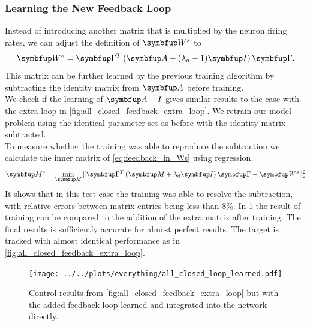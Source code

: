 \subsubsection{Learning the New Feedback Loop}
Instead of introducing another matrix that is multiplied by the neuron firing rates, we can adjust the definition of $\bmu{W}^s$ to
\begin{equation}\label{eq:feedback_in_Ws}
\bmu{W}^s = \bmu{\Gamma}^T\left(\bmu{A} + (\lambda_d-1)\bmu{I} \right)\bmu{\Gamma}.
\end{equation}
This matrix can be further learned by the previous training algorithm by subtracting the identity matrix from $\bmu{A}$ before training.\\
We check if the learning of $\bmu{A-I}$ gives similar results to the case with the extra loop in \cref{fig:all_closed_feedback_extra_loop}. We retrain our model problem using the identical parameter set as before with the identity matrix subtracted.\\
To measure whether the training was able to reproduce the subtraction we calculate the inner matrix of \cref{eq:feedback_in_Ws} using regression.
\begin{equation}
	\bmu{M^*} = \min_{\bmu{M}} \| \bmu{\Gamma}^T\left(\bmu{M}+\lambda_d\bmu{I}\right)\bmu{\Gamma} - \bmu{W}^s\|_2^2
\end{equation}
It shows that in this test case the training was able to resolve the subtraction, with relative errors between matrix entries being less than 8\%.
In \cref{fig:all_closed_loop_learned} the result of training can be compared to the addition of the extra matrix after training. The final results is sufficiently accurate for almost perfect results. The target is tracked with almost identical performance as in \cref{fig:all_closed_feedback_extra_loop}.
\begin{figure}
	\centering
	\texttt{[image: ../../plots/everything/all\_closed\_loop\_learned.pdf]}
	\caption{Control results from \cref{fig:all_closed_feedback_extra_loop} but with the added feedback loop learned and integrated into the network directly.}
	\label{fig:all_closed_loop_learned}
\end{figure}

